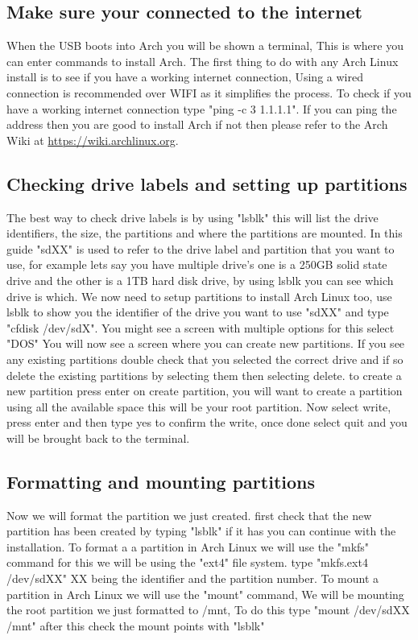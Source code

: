 \documentclass[titlepage]{article}
\begin{document}
   \subsection{Make sure your connected to the internet}
   When the USB boots into Arch you will be shown a terminal, This is where you can enter commands to install Arch. The first thing to do with any Arch Linux install is to see if you have a working internet connection, Using a wired connection is recommended over WIFI as it simplifies the process. To check if you have a working internet connection type "ping -c 3 1.1.1.1". If you can ping the address then you are good to install Arch if not then please refer to the Arch Wiki at \url{https://wiki.archlinux.org}.
   \vspace*{0.5 cm}
   \subsection{Checking drive labels and setting up partitions}
   The best way to check drive labels is by using "lsblk" this will list the drive identifiers, the size, the partitions and where the partitions are mounted. In this guide "sdXX" is used to refer to the drive label and partition that you want to use, for example lets say you have multiple drive's one is a 250GB solid state drive and the other is a 1TB hard disk drive, by using lsblk you can see which drive is which. We now need to setup partitions to install Arch Linux too, use lsblk to show you the identifier of the drive you want to use "sdXX" and type "cfdisk /dev/sdX". You might see a screen with multiple options for this select "DOS" You will now see a screen where you can create new partitions. If you see any existing partitions double check that you selected the correct drive and if so delete the existing partitions by selecting them then selecting delete. to create a new partition press enter on create partition, you will want to create a partition using all the available space this will be your root partition. Now select write, press enter and then type yes to confirm the write, once done select quit and you will be brought back to the terminal.
   \vspace*{0.5 cm}
   \subsection{Formatting and mounting partitions}
   Now we will format the partition we just created. first check that the new partition has been created by typing "lsblk" if it has you can continue with the installation. To format a a partition in Arch Linux we will use the "mkfs" command for this we will be using the "ext4" file system. type "mkfs.ext4 /dev/sdXX" XX being the identifier and the partition number. To mount a partition in Arch Linux we will use the "mount" command, We will be mounting the root partition we just formatted to /mnt, To do this type "mount /dev/sdXX /mnt" after this check the mount points with "lsblk"
   \vspace*{0.5 cm}
\end{document}
